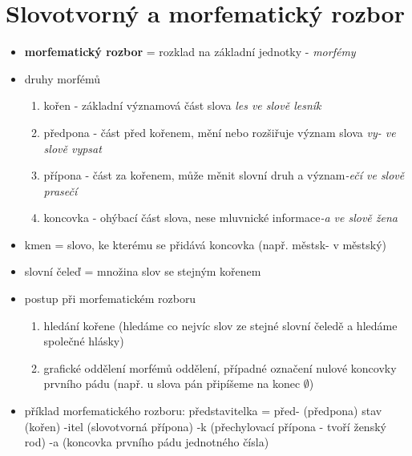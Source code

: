 \documentclass{memoir}
\begin{document}
\section*{Slovotvorný a morfematický rozbor}
\begin{itemize}
	\item \textbf{morfematický rozbor} = rozklad na základní jednotky - \textit{morfémy}
	\item druhy morfémů
	\begin{enumerate}
		\item kořen - základní významová část slova \hfill\textit{les ve slově lesník}
		\item předpona - část před kořenem, mění nebo rozšiřuje význam slova \hfill\textit{vy- ve slově vypsat}
		\item přípona - část za kořenem, může měnit slovní druh a význam\hfill\textit{-ečí ve slově prasečí}
		\item koncovka - ohýbací část slova, nese mluvnické informace\hfill\textit{-a ve slově žena}
	\end{enumerate}

	\item kmen = slovo, ke kterému se přidává koncovka (např. městsk- v městský)
	\item slovní čeleď = množina slov se stejným kořenem
	\item postup při morfematickém rozboru
	\begin{enumerate}
		\item hledání kořene (hledáme co nejvíc slov ze stejné slovní čeledě a hledáme společné hlásky)
		\item grafické oddělení morfémů oddělení, případné označení nulové koncovky prvního pádu (např. u slova pán připíšeme na konec $\emptyset$)
	\end{enumerate}
	\item příklad morfematického rozboru: představitelka = před- (předpona) stav (kořen) -itel (slovotvorná přípona) -k (přechylovací přípona - tvoří ženský rod) -a (koncovka prvního pádu jednotného čísla)\\
\end{itemize}
\end{document}
